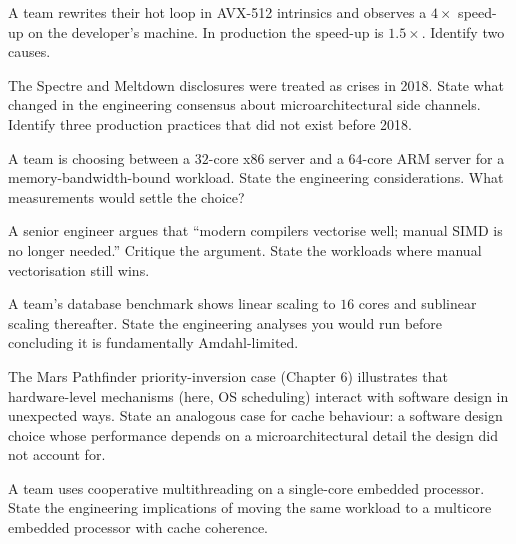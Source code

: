 \begin{exercise}
A team rewrites their hot loop in AVX-512 intrinsics and observes a $4\times$ speed-up on the developer's machine. In production the speed-up is $1.5\times$. Identify two causes.
\end{exercise}

\begin{exercise}
The Spectre and Meltdown disclosures \cite{paper:kocher-spectre-2019,paper:lipp-meltdown-2018} were treated as crises in 2018. State what changed in the engineering consensus about microarchitectural side channels. Identify three production practices that did not exist before 2018.
\end{exercise}

\begin{exercise}
A team is choosing between a $32$-core x86 server and a $64$-core ARM server for a memory-bandwidth-bound workload. State the engineering considerations. What measurements would settle the choice?
\end{exercise}

\begin{exercise}
A senior engineer argues that ``modern compilers vectorise well; manual SIMD is no longer needed.'' Critique the argument. State the workloads where manual vectorisation still wins.
\end{exercise}

\begin{exercise}
A team's database benchmark shows linear scaling to $16$ cores and sublinear scaling thereafter. State the engineering analyses you would run before concluding it is fundamentally Amdahl-limited.
\end{exercise}

\begin{exercise}
The Mars Pathfinder priority-inversion case (Chapter 6) illustrates that hardware-level mechanisms (here, OS scheduling) interact with software design in unexpected ways. State an analogous case for cache behaviour: a software design choice whose performance depends on a microarchitectural detail the design did not account for.
\end{exercise}

\begin{exercise}
A team uses cooperative multithreading on a single-core embedded processor. State the engineering implications of moving the same workload to a multicore embedded processor with cache coherence.
\end{exercise}

